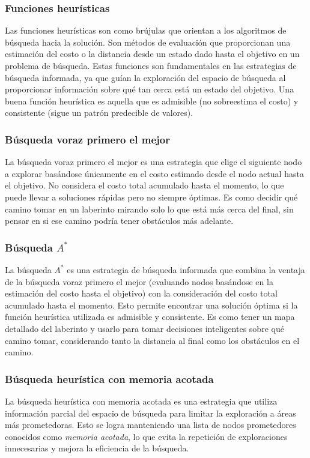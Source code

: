 \subsubsection*{Funciones heurísticas}

Las funciones heurísticas son como brújulas que orientan a los algoritmos de búsqueda 
hacia la solución. Son métodos de evaluación que proporcionan una estimación del costo 
o la distancia desde un estado dado hasta el objetivo en un problema de búsqueda. Estas 
funciones son fundamentales en las estrategias de búsqueda informada, ya que guían la 
exploración del espacio de búsqueda al proporcionar información sobre qué tan cerca está  
un estado del objetivo. Una buena función heurística es aquella que es admisible (no 
sobreestima el costo) y consistente (sigue un patrón predecible de valores). 

\subsubsection*{Búsqueda voraz primero el mejor}

La búsqueda voraz primero el mejor es una estrategia que elige el siguiente nodo a 
explorar basándose únicamente en el costo estimado desde el nodo actual hasta el objetivo. 
No considera el costo total acumulado hasta el momento, lo que puede llevar a soluciones 
rápidas pero no siempre óptimas. Es como decidir qué camino tomar en un laberinto mirando 
solo lo que está más cerca del final, sin pensar en si ese camino podría tener obstáculos 
más adelante.

\subsubsection*{Búsqueda $A^{*}$}

La búsqueda $A^{*}$ es una estrategia de búsqueda informada que combina la ventaja de la 
búsqueda voraz primero el mejor (evaluando nodos basándose en la estimación del costo 
hasta el objetivo) con la consideración del costo total acumulado hasta el momento. Esto 
permite encontrar una solución óptima si la función heurística utilizada es admisible y 
consistente. Es como tener un mapa detallado del laberinto y usarlo para tomar decisiones 
inteligentes sobre qué camino tomar, considerando tanto la distancia al final como los 
obstáculos en el camino.

\subsubsection*{Búsqueda heurística con memoria acotada}

La búsqueda heurística con memoria acotada es una estrategia que utiliza información 
parcial del espacio de búsqueda para limitar la exploración a áreas más prometedoras. 
Esto se logra manteniendo una lista de nodos prometedores conocidos como 
\textit{memoria acotada}, lo que evita la repetición de exploraciones innecesarias y 
mejora la eficiencia de la búsqueda.